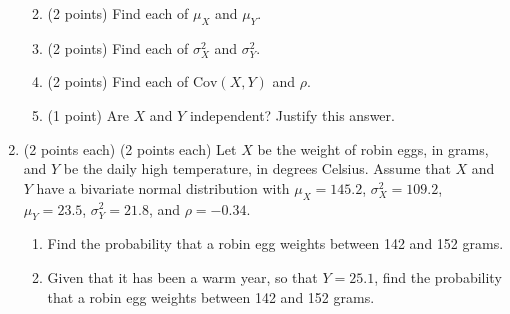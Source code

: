 \documentclass[11pt]{article}
\newenvironment{solution}
  {\textit{Solution.}}
\newcommand{\sol}[1]{
    \begin{customframedproof}[linecolor=orangehdx!75,]
        \begin{solution}
        #1
        \end{solution}
    \end{customframedproof}
}
\begin{document}
\begin{enumerate}
\begin{enumerate}
{        }
        \item (2 points) Find each of \(\mu_{X}\) and \(\mu_{Y}\).
        \sol{
            
        }
        \item (2 points) Find each of \(\sigma_{X}^{2}\) and \(\sigma_{Y}^{2}\).
        \sol{
            
        }
        \item (2 points) Find each of \(\text{Cov}(X,Y)\) and \(\rho\).
        \sol{
            
        }
        \item (1 point) Are \(X\) and \(Y\) independent? Justify this answer.
        \sol{
            
        }
    \end{enumerate}
    \item (2 points each) (2 points each) Let \(X\) be the weight of robin eggs, in grams, and \(Y\) be the daily high temperature, in degrees Celsius. Assume that \(X\) and \(Y\) have a bivariate normal distribution with \(\mu_{X} = 145.2\), \(\sigma_{X}^{2} = 109.2\), \(\mu_{Y} = 23.5\), \(\sigma_{Y}^{2} = 21.8\), and \(\rho = -0.34\).
    \begin{enumerate}
        \item Find the probability that a robin egg weights between 142 and 152 grams.
        \sol{
            
        }
        \item Given that it has been a warm year, so that \(Y = 25.1\), find the probability that a robin egg weights between 142 and 152 grams.
        \sol{
            
        }
    \end{enumerate}
\end{enumerate}
\end{document}
